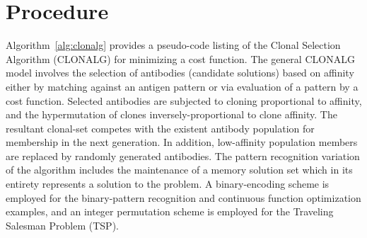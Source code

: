 \documentclass[a4paper, 11pt]{article}
\begin{document}
\section{Procedure}
\label{sec:procedure}
Algorithm~\ref{alg:clonalg} provides a pseudo-code listing of the Clonal Selection Algorithm (CLONALG) for minimizing a cost function. 
The general CLONALG model involves the selection of antibodies (candidate solutions) based on affinity either by matching against an antigen pattern or via evaluation of a pattern by a cost function. Selected antibodies are subjected to cloning proportional to affinity, and the hypermutation of clones inversely-proportional to clone affinity. The resultant clonal-set competes with the existent antibody population for membership in the next generation. In addition, low-affinity population members are replaced by randomly generated antibodies. The pattern recognition variation of the algorithm includes the maintenance of a memory solution set which in its entirety represents a solution to the problem. A binary-encoding scheme is employed for the binary-pattern recognition and continuous function optimization examples, and an integer permutation scheme is employed for the Traveling Salesman Problem (TSP).
\end{document}

